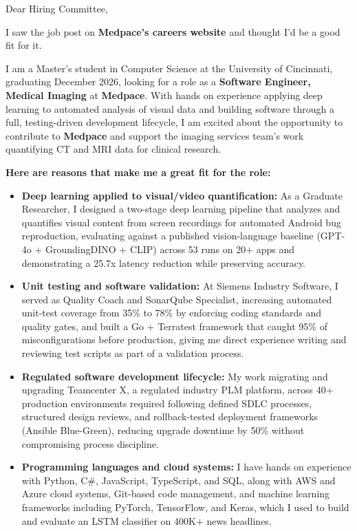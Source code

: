 \documentclass[11pt]{letter}
\date{}
\begin{document}
\begin{letter}{}

\opening{Dear Hiring Committee,}

I saw the job post on \textbf{Medpace's careers website} and thought I'd be a good fit for it.

I am a Master's student in Computer Science at the University of Cincinnati, graduating December 2026, looking for a role as a \textbf{Software Engineer, Medical Imaging} at \textbf{Medpace}. With hands on experience applying deep learning to automated analysis of visual data and building software through a full, testing-driven development lifecycle, I am excited about the opportunity to contribute to \textbf{Medpace} and support the imaging services team's work quantifying CT and MRI data for clinical research.

\textbf{Here are reasons that make me a great fit for the role:}

\begin{itemize}[leftmargin=*, itemsep=0.45em]
    \item \textbf{Deep learning applied to visual/video quantification:} As a Graduate Researcher, I designed a two-stage deep learning pipeline that analyzes and quantifies visual content from screen recordings for automated Android bug reproduction, evaluating against a published vision-language baseline (GPT-4o + GroundingDINO + CLIP) across 53 runs on 20+ apps and demonstrating a 25.7x latency reduction while preserving accuracy.

    \item \textbf{Unit testing and software validation:} At Siemens Industry Software, I served as Quality Coach and SonarQube Specialist, increasing automated unit-test coverage from 35\% to 78\% by enforcing coding standards and quality gates, and built a Go + Terratest framework that caught 95\% of misconfigurations before production, giving me direct experience writing and reviewing test scripts as part of a validation process.

    \item \textbf{Regulated software development lifecycle:} My work migrating and upgrading Teamcenter X, a regulated industry PLM platform, across 40+ production environments required following defined SDLC processes, structured design reviews, and rollback-tested deployment frameworks (Ansible Blue-Green), reducing upgrade downtime by 50\% without compromising process discipline.

    \item \textbf{Programming languages and cloud systems:} I have hands on experience with Python, C\#, JavaScript, TypeScript, and SQL, along with AWS and Azure cloud systems, Git-based code management, and machine learning frameworks including PyTorch, TensorFlow, and Keras, which I used to build and evaluate an LSTM classifier on 400K+ news headlines.


\end{itemize}
\end{letter}
\end{document}
